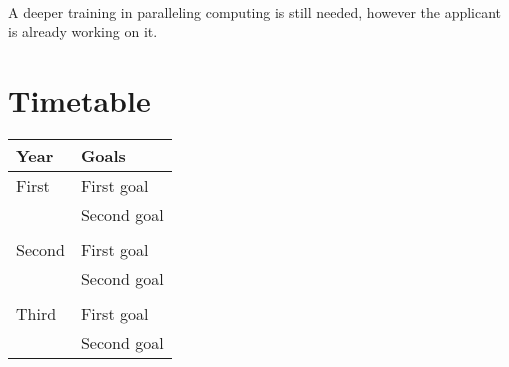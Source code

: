\documentclass[a4,useAMS,usenatbib,usegraphicx,12pt]{article}
\begin{document}
\

A deeper training in paralleling computing is still needed, however the applicant
is already working on it.


\section{Timetable}

\begin{table}[h]
\begin{flushleft}
\begin{center}
  \begin{tabular}{l  l} \hline\hline
	\centering\textbf{Year} & \textbf{Goals} \\ \hline
	First  
	& \tabitem First goal \\
	& \tabitem Second goal\\
	
	\\
	Second
	& \tabitem First goal \\
	& \tabitem Second goal\\

	\\	
	Third
	& \tabitem First goal \\
	& \tabitem Second goal\\ 
	
	\hline\hline
  \end{tabular}  
\end{center}
\end{flushleft}
\end{table}



\renewcommand{\bibname}{8\ \ \ \ Bibliography}

\end{document}

